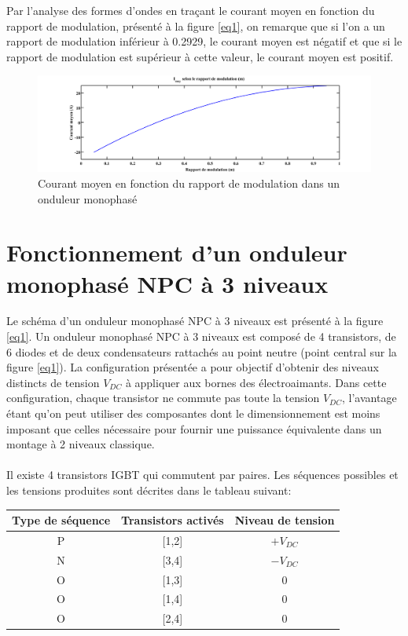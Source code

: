 Par l'analyse des formes d'ondes en traçant le courant moyen en fonction du rapport de modulation, présenté à la figure \ref{eq1}, on remarque que si l'on a un rapport de modulation inférieur à 0.2929, le courant moyen est négatif et que si le rapport de modulation est supérieur à cette valeur, le courant moyen est positif.

\begin{figure}[htb]
\centering
\includegraphics[scale=0.4]{fig/Imoy_m.png}
\caption{Courant moyen en fonction du rapport de modulation dans un onduleur monophasé}
\end{figure}

\section{Fonctionnement d'un onduleur monophasé NPC à 3 niveaux}
Le schéma d'un onduleur monophasé NPC à 3 niveaux est présenté à la figure \ref{eq1}. Un onduleur monophasé NPC à 3 niveaux est composé de 4 transistors, de 6 diodes et de deux condensateurs rattachés au point neutre (point central sur la figure \ref{eq1}). La configuration présentée a pour objectif d'obtenir des niveaux distincts de tension $V_{DC}$ à appliquer aux bornes des électroaimants. Dans cette configuration, chaque transistor ne commute pas toute la tension $V_{DC}$, l'avantage étant qu'on peut utiliser des composantes dont le dimensionnement est moins imposant que celles nécessaire pour fournir une puissance équivalente dans un montage à 2 niveaux classique. 

\paragraph{}Il existe 4 transistors IGBT qui commutent par paires. Les séquences possibles et les tensions produites sont décrites dans le tableau suivant:

\begin{table}[htb]
\centering
\begin{tabular}{ |c|c|c| }
\hline
  Type de séquence & Transistors activés & Niveau de tension \\\hline\hline
  P & [1,2] & $+V_{DC}$ \\\hline
  N & [3,4] & $-V_{DC}$ \\\hline
  O & [1,3] & $0$ \\\hline
  O & [1,4] & $0$ \\\hline
  O & [2,4] & $0$ \\\hline
\end{tabular}
\end{table}

